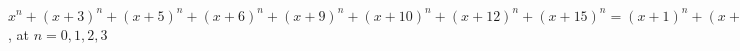 $x^n+(x+3)^n+(x+5)^n+(x+6)^n+(x+9)^n+(x+10)^n+(x+12)^n+(x+15)^n=(x+1)^n+(x+2)^n
+(x+4)^n+(x+7)^n+(x+8)^n+(x+11)^n+(x+13)^n+(x+14)^n$, at $n=0,1,2,3$
























































